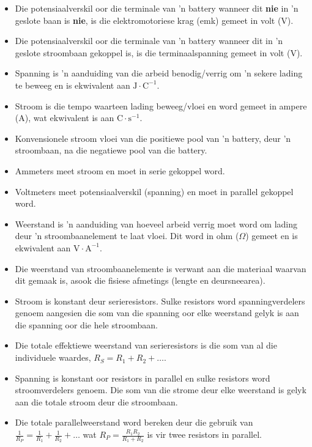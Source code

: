\label{m38781*id201947}\begin{itemize}[noitemsep ] 
\item Die potensiaalverskil oor die terminale van 'n battery wanneer dit
\textbf{nie} in 'n geslote baan is \textbf{nie}, is die elektromotoriese krag
(emk) gemeet in volt (V).
\item Die potensiaalverskil oor die terminale van 'n battery wanneer dit in
 'n geslote stroombaan gekoppel is, is die terminaalspanning gemeet in volt (V).
\item Spanning is 'n aanduiding van die arbeid benodig/verrig om 'n sekere
lading te beweeg en is ekwivalent aan $\text{J}\cdot\text{C}^{-1}$.
\item Stroom is die tempo waarteen lading beweeg/vloei en word gemeet in ampere
(A), wat ekwivalent is aan $\text{C}\cdot\text{s}^{-1}$.
\item Konvensionele stroom vloei van die positiewe pool van 'n battery,
deur 'n stroombaan, na die negatiewe pool van die battery.
\item Ammeters meet stroom en moet in serie gekoppel word.
\item Voltmeters meet potensiaalverskil (spanning) en moet in parallel
gekoppel word.
\item Weerstand is 'n aanduiding van hoeveel arbeid verrig moet word om lading
deur 'n stroombaanelement te laat vloei. Dit word in ohm ($\Omega$) gemeet en
is ekwivalent aan  $\text{V}\cdot\text{A}^{-1}$.
\item Die weerstand van stroombaanelemente is verwant aan die materiaal waarvan
dit gemaak is, asook die fisiese afmetings (lengte en deursneearea).
\item Stroom is konstant deur serieresistors. Sulke resistors word
spanningverdelers genoem aangesien die som van die spanning oor elke weerstand
gelyk is aan die spanning oor die hele stroombaan.
\item Die totale effektiewe weerstand van serieresistors is die som van al die
individuele waardes, $R_S=R_1+R_2+\ldots$.
\item Spanning is konstant oor resistors in parallel en sulke resistors
word stroomverdelers genoem. Die som van die strome deur elke weerstand is
gelyk aan die totale stroom deur die stroombaan.
\item Die totale parallelweerstand word bereken deur die gebruik van 
$\frac{1}{R_P}=\frac{1}{R_1}+\frac{1}{R_2}+\ldots$ wat
$R_P=\frac{R_1R_2}{R_1+R_2}$ is vir twee resistors in parallel.
\end{itemize}
